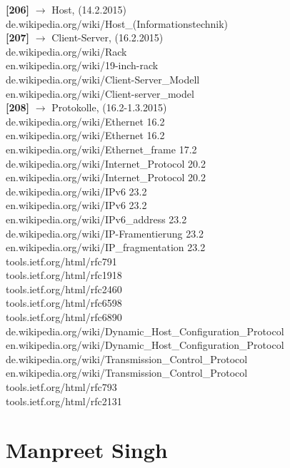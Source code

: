 \documentclass[12pt,a4paper]{report}
\begin{document}
\begin{onehalfspace}
\noindent
\textbf{[206]} $\rightarrow$  Host, (14.2.2015)\\
de.wikipedia.org/wiki/Host\_(Informationstechnik) \\

\noindent
\textbf{[207]} $\rightarrow$  Client-Server, (16.2.2015)\\
de.wikipedia.org/wiki/Rack\\
en.wikipedia.org/wiki/19-inch-rack\\
de.wikipedia.org/wiki/Client-Server\_Modell\\
en.wikipedia.org/wiki/Client-server\_model \\

\noindent
\textbf{[208]} $\rightarrow$ Protokolle, (16.2-1.3.2015)\\
de.wikipedia.org/wiki/Ethernet 16.2 \\
en.wikipedia.org/wiki/Ethernet 16.2 \\
en.wikipedia.org/wiki/Ethernet\_frame 17.2 \\
de.wikipedia.org/wiki/Internet\_Protocol 20.2\\
en.wikipedia.org/wiki/Internet\_Protocol 20.2\\
de.wikipedia.org/wiki/IPv6 23.2\\
en.wikipedia.org/wiki/IPv6 23.2\\
en.wikipedia.org/wiki/IPv6\_address 23.2\\
de.wikipedia.org/wiki/IP-Framentierung 23.2\\
en.wikipedia.org/wiki/IP\_fragmentation 23.2\\
tools.ietf.org/html/rfc791\\
tools.ietf.org/html/rfc1918\\
tools.ietf.org/html/rfc2460\\
tools.ietf.org/html/rfc6598\\
tools.ietf.org/html/rfc6890\\
de.wikipedia.org/wiki/Dynamic\_Host\_Configuration\_Protocol\\
en.wikipedia.org/wiki/Dynamic\_Host\_Configuration\_Protocol\\
de.wikipedia.org/wiki/Transmission\_Control\_Protocol\\
en.wikipedia.org/wiki/Transmission\_Control\_Protocol\\
tools.ietf.org/html/rfc793\\
tools.ietf.org/html/rfc2131\\

\chapter{Manpreet Singh}


\end{onehalfspace}
\end{document}
